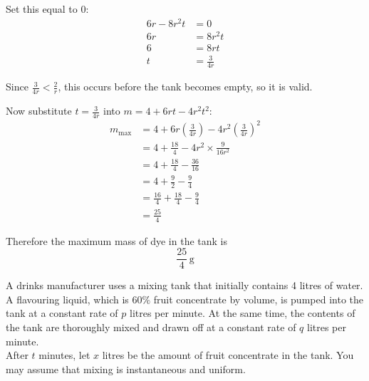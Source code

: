 \documentclass[leqno]{article}
\begin{document}
\begin{enumerate}[
  label=\textbf{\arabic*.},
  leftmargin=*,
  topsep=0pt,
  partopsep=0pt,
  parsep=0pt
]
\begin{djsSolution}
\begin{enumerate}[label=\textbf{(\alph*)}]
\begin{enumerate}[label=(\roman*)]
    Set this equal to $0$:
    \begin{align*}
    6r-8r^2t &= 0 \\
    6r &= 8r^2t \\
    6 &= 8rt \\
    t &= \frac{3}{4r}
    \end{align*}

    Since $\frac{3}{4r}<\frac{2}{r}$, this occurs before the tank becomes empty, so it is valid.

    Now substitute $t=\frac{3}{4r}$ into $m=4+6rt-4r^2t^2$:
    \begin{align*}
    m_{\max}
    &= 4+6r\left(\frac{3}{4r}\right)-4r^2\left(\frac{3}{4r}\right)^2 \\
    &= 4+\frac{18}{4}-4r^2\times\frac{9}{16r^2} \\
    &= 4+\frac{18}{4}-\frac{36}{16} \\
    &= 4+\frac{9}{2}-\frac{9}{4} \\
    &= \frac{16}{4}+\frac{18}{4}-\frac{9}{4} \\
    &= \frac{25}{4}
    \end{align*}

    Therefore the maximum mass of dye in the tank is
    \[
    \frac{25}{4}\,\mathrm{g}
    \]
  \end{enumerate}
\end{enumerate}
\end{djsSolution}


\newpage

\questionitem

A drinks manufacturer uses a mixing tank that initially contains 4 litres of water. A flavouring liquid, which is $60\%$ fruit concentrate by volume, is pumped into the tank at a constant rate of $p$ litres per minute. At the same time, the contents of the tank are thoroughly mixed and drawn off at a constant rate of $q$ litres per minute. \\

After $t$ minutes, let $x$ litres be the amount of fruit concentrate in the tank. You may assume that mixing is instantaneous and uniform. \\


\end{enumerate}
\end{document}
